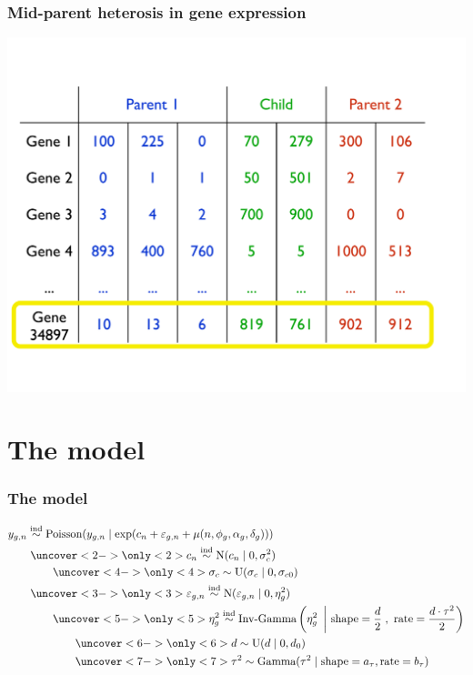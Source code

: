 \documentclass[handout]{beamer}
\providecommand{\e}{\varepsilon}
\numberwithin{equation}{section}
\begin{document}
\begin{frame}
\frametitle{Mid-parent heterosis in gene expression}
\begin{center}
\includegraphics[scale=.35]{fig/mphrnaseq}
\end{center}
\end{frame}


\section{The model}

\begin{frame}
\frametitle{The model}

\begin{align*}
&y_{g,n} \stackrel{\text{ind}}{\sim} \text{Poisson}(y_{g, n} \mid \exp(c_n + \e_{g, n} + \mu(n, \phi_g, \alpha_g, \delta_g))) \\
&\qquad \uncover<2->{\only<2>{\color{blue}}c_n \stackrel{\text{ind}}{\sim} \text{N}(c_n \mid 0, \sigma_c^2)} \\
& \qquad \qquad \uncover<4->{\only<4>{\color{blue}}\sigma_c \stackrel{\text{}}{\sim} \text{U}(\sigma_c \mid 0, \sigma_{c0})} \\
& \qquad \uncover<3->{\only<3>{\color{blue}}\e_{g, n} \stackrel{\text{ind}}{\sim} \text{N}(\e_{g, n} \mid 0, \eta_g^2)} \\
& \qquad \qquad \uncover<5->{\only<5>{\color{blue}}\eta_g^2 \stackrel{\text{ind}}{\sim} \text{Inv-Gamma}\left (\eta_g^2 \ \left | \ \text{shape} = \frac{d}{2} \right ., \ \text{rate} =  \frac{d \cdot \tau^2}{2} \right)} \\
& \qquad \qquad \qquad \uncover<6->{\only<6>{\color{blue}} d \stackrel{\text{}}{\sim} \text{U}(d \mid 0, d_0)} \\
& \qquad \qquad \qquad \uncover<7->{\only<7>{\color{blue}} \tau^2 \stackrel{\text{}}{\sim} \text{Gamma}(\tau^2 \mid \text{shape} = a_\tau, \text{rate} = b_\tau)} \\
\end{align*}
\end{frame}
\end{document}
